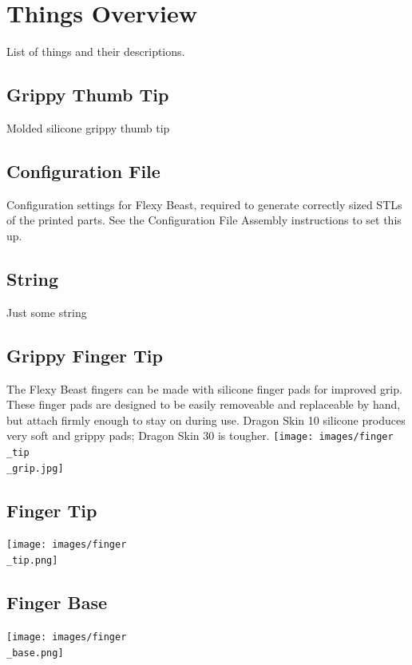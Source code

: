 \documentclass[11pt]{article}
\begin{document}
\newpage

\section{Things Overview}
List of things and their descriptions.

\hypertarget{thing_thumb\_tip\_grip}{\subsection{Grippy Thumb Tip}}
Molded silicone grippy thumb tip

\hypertarget{thing_config\_file}{\subsection{Configuration File}}
Configuration settings for Flexy Beast, required to generate correctly sized STLs of the printed parts. See the Configuration File Assembly instructions to set this up.

\hypertarget{thing_string}{\subsection{String}}
Just some string

\hypertarget{thing_finger\_tip\_grip}{\subsection{Grippy Finger Tip}}
The Flexy Beast fingers can be made with silicone finger pads for improved grip. These finger pads are designed to be easily removeable and replaceable by hand, but attach firmly enough to stay on during use. Dragon Skin 10 silicone produces very soft and grippy pads; Dragon Skin 30 is tougher.
\texttt{[image: images/finger\\\_tip\\\_grip.jpg]}

\hypertarget{thing_finger\_tip}{\subsection{Finger Tip}}
\texttt{[image: images/finger\\\_tip.png]}

\hypertarget{thing_finger\_base}{\subsection{Finger Base}}
\texttt{[image: images/finger\\\_base.png]}
\end{document}
